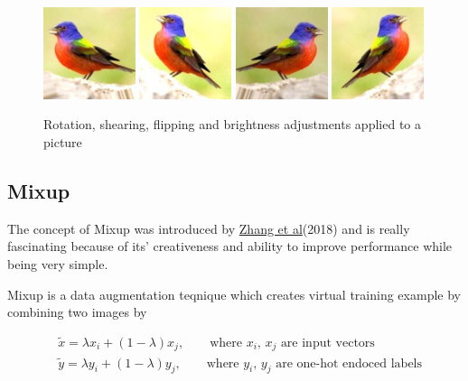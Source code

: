 \documentclass{article}
\begin{document}
\begin{figure}[h]
	\includegraphics[width=0.24\textwidth]{aug1.jpeg}
\includegraphics[width=0.24\textwidth]{aug2.jpeg}
\includegraphics[width=0.24\textwidth]{aug3.jpeg}
\includegraphics[width=0.24\textwidth]{aug4.jpeg}
	\caption{Rotation, shearing, flipping and brightness adjustments applied to a picture}
\end{figure}




\subsection{Mixup}
The concept of Mixup was introduced by \href{https://arxiv.org/pdf/1710.09412.pdf}{Zhang et al}(2018) and is really fascinating because of its' creativeness and ability to improve performance while being very simple. 

Mixup is a data augmentation teqnique which creates virtual training example by combining two images by 

\begin{align*}
&\tilde{x} = \lambda x_i + (1-\lambda) x_j, \qquad \text{where $x_i$, $x_j$ are input vectors} \\
&\tilde{y} = \lambda y_i + (1-\lambda) y_j, \qquad \text{where $y_i$, $y_j$ are one-hot endoced labels}
\end{align*}
\end{document}
